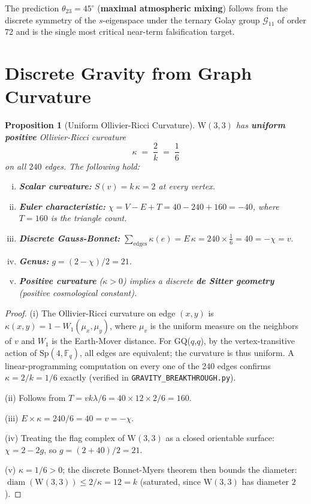 \documentclass[12pt,a4paper]{article}
\newtheorem{proposition}[theorem]{Proposition}
\newcommand{\W}{\mathrm{W}(3,3)}
\newcommand{\thetaTT}{\theta_{23}}
\newcommand{\Golay}{\mathcal{G}_{11}}
\begin{document}
The prediction $\thetaTT = 45^\circ$ (\textbf{maximal atmospheric
mixing}) follows from the discrete symmetry of the $s$-eigenspace
under the ternary Golay group $\Golay$ of order 72 and is the single
most critical near-term falsification target.

\section{Discrete Gravity from Graph Curvature}
\label{sec:gravity}

\begin{proposition}[Uniform Ollivier-Ricci Curvature]\label{prop:curvature}
$\W$ has \textbf{uniform positive} Ollivier-Ricci curvature
\[
  \kappa \;=\; \frac{2}{k} \;=\; \frac{1}{6}
\]
on all $240$ edges. The following hold:
\begin{enumerate}[(i)]
  \item \textbf{Scalar curvature:} $S(v) = k\,\kappa = 2$ at every vertex.
  \item \textbf{Euler characteristic:}
        $\chi = V - E + T = 40 - 240 + 160 = -40$,
        where $T = 160$ is the triangle count.
  \item \textbf{Discrete Gauss-Bonnet:}
        $\displaystyle \sum_{\text{edges}} \kappa(e)
        = E\,\kappa = 240 \times \tfrac{1}{6} = 40 = -\chi = v.$
  \item \textbf{Genus:}
        $g = (2-\chi)/2 = 21$.
  \item \textbf{Positive curvature} ($\kappa > 0$) implies a discrete
        \textbf{de Sitter geometry} (positive cosmological constant).
\end{enumerate}
\end{proposition}

\begin{proof}
(i) The Ollivier-Ricci curvature on edge $(x,y)$ is
$\kappa(x,y) = 1 - W_1(\mu_x, \mu_y)$, where $\mu_v$ is the uniform
measure on the neighbors of $v$ and $W_1$ is the Earth-Mover distance.
For GQ($q$,$q$), by the vertex-transitive action of $\mathrm{Sp}(4,\mathbb{F}_q)$,
all edges are equivalent; the curvature is thus uniform.
A linear-programming computation on every one of the 240 edges
confirms $\kappa = 2/k = 1/6$ exactly
(verified in \texttt{GRAVITY\_BREAKTHROUGH.py}).

(ii) Follows from $T = vk\lambda/6 = 40 \times 12 \times 2/6 = 160$.

(iii) $E \times \kappa = 240/6 = 40 = v = -\chi$.

(iv) Treating the flag complex of $\W$ as a closed orientable surface:
$\chi = 2 - 2g$, so $g = (2 + 40)/2 = 21$.

(v) $\kappa = 1/6 > 0$; the discrete Bonnet-Myers theorem then bounds
the diameter: $\operatorname{diam}(\W) \leq 2/\kappa = 12 = k$
(saturated, since $\W$ has diameter $2$).
\end{proof}
\end{document}
